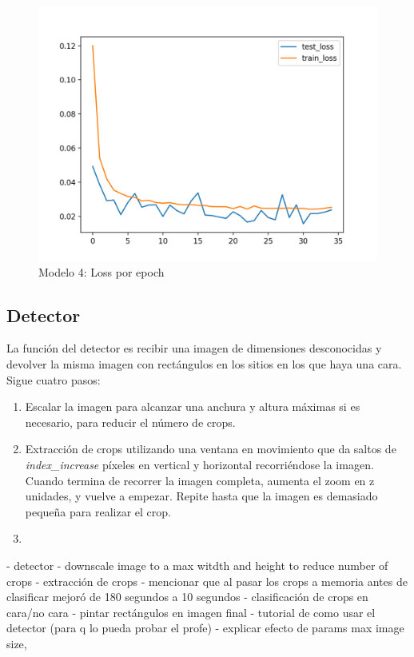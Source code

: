 \documentclass[a4paper, 11pt]{article}
\begin{document}
					
			\begin{figure}[htb!]
				\begin{minipage}{1\textwidth}
					\centering
					\includegraphics[scale=.5]{pics/model4_losses_per_epoch}
					\caption{Modelo 4: Loss por epoch}
					\label{fig:model4_losses_per_epoch}
				\end{minipage}\hfill
			\end{figure}
			
		\subsection{Detector}
			La función del detector es recibir una imagen de dimensiones desconocidas y devolver la misma imagen con rectángulos en los sitios en los que haya una cara. Sigue cuatro pasos:\\
			
			\begin{enumerate}
				\item Escalar la imagen para alcanzar una anchura y altura máximas si es necesario, para reducir el número de crops. 
				\item Extracción de crops utilizando una ventana en movimiento que da saltos de \textit{index\_increase} píxeles en vertical y horizontal recorriéndose la imagen. Cuando termina de recorrer la imagen completa, aumenta el zoom en z unidades, y vuelve a empezar. Repite hasta que la imagen es demasiado pequeña para realizar el crop.
				\item 
			\end{enumerate}
			- detector
				- downscale image to a max witdth and height to reduce number of crops
				- extracción de crops 
					- mencionar que al pasar los crops a memoria antes de clasificar mejoró de 180 segundos a 10 segundos
				- clasificación de crops en cara/no cara
				- pintar rectángulos en imagen final
				- tutorial de como usar el detector (para q lo pueda probar el profe)
				- explicar efecto de params max image size, 
				
\end{document}
